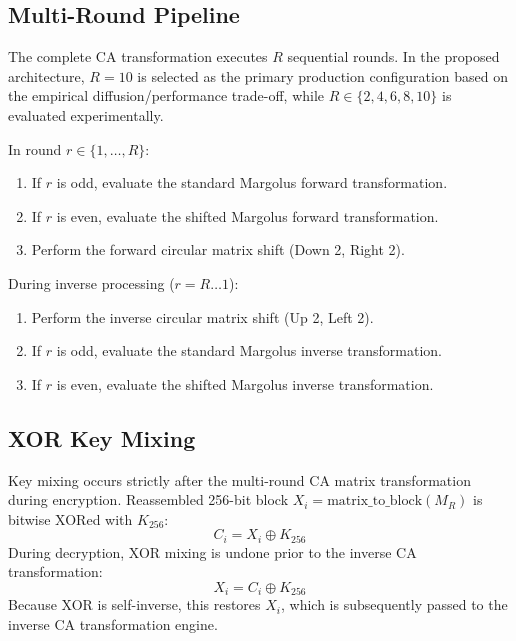\subsection{Multi-Round Pipeline}
\label{subsec:multi_round}
The complete CA transformation executes $R$ sequential rounds. In the proposed architecture, $R = 10$ is selected as the primary production configuration based on the empirical diffusion/performance trade-off, while $R \in \{2, 4, 6, 8, 10\}$ is evaluated experimentally.

In round $r \in \{1, \dots, R\}$:
\begin{enumerate}
    \item If $r$ is odd, evaluate the standard Margolus forward transformation.
    \item If $r$ is even, evaluate the shifted Margolus forward transformation.
    \item Perform the forward circular matrix shift (Down 2, Right 2).
\end{enumerate}

During inverse processing ($r = R \dots 1$):
\begin{enumerate}
    \item Perform the inverse circular matrix shift (Up 2, Left 2).
    \item If $r$ is odd, evaluate the standard Margolus inverse transformation.
    \item If $r$ is even, evaluate the shifted Margolus inverse transformation.
\end{enumerate}

\subsection{XOR Key Mixing}
\label{subsec:xor_architecture}
Key mixing occurs strictly after the multi-round CA matrix transformation during encryption. Reassembled 256-bit block $X_i = \text{matrix\_to\_block}(M_R)$ is bitwise XORed with $K_{256}$:
\begin{equation}
C_i = X_i \oplus K_{256}
\end{equation}
During decryption, XOR mixing is undone prior to the inverse CA transformation:
\begin{equation}
X_i = C_i \oplus K_{256}
\end{equation}
Because XOR is self-inverse, this restores $X_i$, which is subsequently passed to the inverse CA transformation engine.

